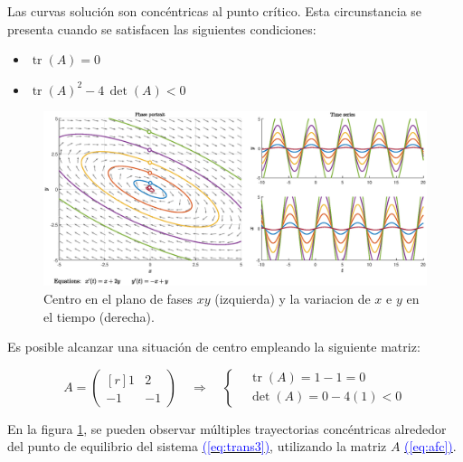 \documentclass[12pt,a4paper]{report} %
\newcommand{\eref}[1]{\hyperref[#1]{\textcolor{blue}{(\ref*{#1})}}}
\newcommand{\eref}[1]{\hyperref[#1]{\textcolor{blue}{\textit{(\ref*{#1})}}}}
\newcommand{\tr}{\operatorname{\textrm{tr}}}
\begin{document}
	\newpage
	
    \vspace{1cm}
    
    \vspace{0.3cm}\noindent Las curvas solución son concéntricas al punto crítico. Esta circunstancia se presenta cuando se satisfacen las siguientes condiciones: 
    \begin{itemize}
    	\item $\tr(A)=0$
    	\item $\tr(A)^2-4\, \det(A)<0$
    \end{itemize}
    
    \begin{figure}[h]
    	\centering
    	\includegraphics[width=1\textwidth]{centro.eps}
    	\caption{Centro en el plano de fases $xy$ (izquierda) y la variacion de $x$ e $y$ en el tiempo (derecha).}
    	\label{fig:centro}
    \end{figure}\smallskip
    
   	\vspace{0.3cm}\noindent Es posible alcanzar una situación de centro empleando la siguiente matriz:
    
	\begin{equation}
	\label{eq:afc}
	A=\begin{pmatrix*}[r]
		1 & 2 \\
		-1 & -1
	\end{pmatrix*} \quad \Longrightarrow \quad 
	\left\{ 
	\begin{aligned}
		&\tr(A)=1-1=0 \\[2mm]
		&\det(A)=0-4(1)<0
	\end{aligned}
	\right.
\end{equation}\smallskip

\vspace{0.5cm}\noindent En la figura \ref{fig:centro}, se pueden observar múltiples trayectorias concéntricas alrededor del punto de equilibrio del sistema \eref{eq:trans3}, utilizando la matriz $A$ \eref{eq:afc}.
	
\end{document}
